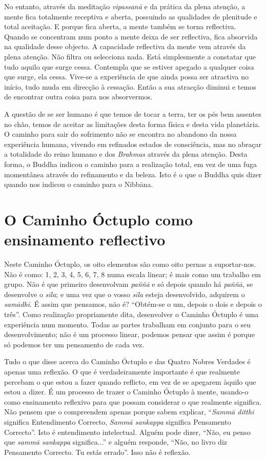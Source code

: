 No entanto, através da meditação \emph{vipassanā} e da prática da plena atenção,
a mente fica totalmente receptiva e aberta, possuindo as qualidades de plenitude
e total aceitação. E porque fica aberta, a mente também se torna reflectiva.
Quando se concentram num ponto a mente deixa de ser reflectiva, fica absorvida
na qualidade desse objecto. A capacidade reflectiva da mente vem através da
plena atenção. Não filtra ou selecciona nada. Está simplesmente a constatar que
tudo aquilo que surge cessa. Contempla que se estiver apegado a qualquer coisa
que surge, ela cessa. Vive-se a experiência de que ainda possa ser atractiva no
início, tudo muda em direcção à cessação. Então a sua atracção diminui e temos
de encontrar outra coisa para nos absorvermos.

A questão de se ser humano é que temos de tocar a terra, ter os pés bem assentes
no chão, temos de aceitar as limitações desta forma física e desta vida
planetária. O caminho para sair do sofrimento não se encontra no abandono da
nossa experiência humana, vivendo em refinados estados de consciência, mas no
abraçar a totalidade do reino humano e dos \emph{Brahmas} através da plena
atenção. Desta forma, o Buddha indicou o caminho para a realização total, em vez
de uma fuga momentânea através do refinamento e da beleza. Isto é o que o Buddha
quis dizer quando nos indicou o caminho para o Nibbāna.

\section{O Caminho Óctuplo como ensinamento reflectivo}

Neste Caminho Óctuplo, os oito elementos são como oito pernas a suportar-nos.
Não é como: 1, 2, 3, 4, 5, 6, 7, 8 numa escala linear; é mais como um trabalho
em grupo. Não é que primeiro desenvolvam \emph{paññā} e só depois quando há
\emph{paññā}, se desenvolve o \emph{sīla}; e uma vez que o vosso \emph{sīla}
esteja desenvolvido, adquirem o \emph{samādhi}. É assim que pensamos, não é?
“Obtém-se o um, depois o dois e depois o três”. Como realização propriamente
dita, desenvolver o Caminho Óctuplo é uma experiência num momento. Todas as
partes trabalham em conjunto para o seu desenvolvimento; não é um processo
linear, podemos pensar que assim é porque só podemos ter um pensamento de cada
vez.

Tudo o que disse acerca do Caminho Óctuplo e das Quatro Nobres Verdades é apenas
uma reflexão. O que é verdadeiramente importante é que realmente percebam o que
estou a fazer quando reflicto, em vez de se apegarem àquilo que estou a dizer. É
um processo de trazer o Caminho Óctuplo à mente, usando-o como ensinamento
reflexivo para que possam considerar o que realmente significa. Não pensem que o
compreendem apenas porque sabem explicar, “\emph{Sammā ditthi} significa
Entendimento Correcto, \emph{Sammā sankappa} significa Pensamento Correcto”.
Isto é entendimento intelectual. Alguém pode dizer, “Não, eu penso que
\emph{sammā sankappa} significa...” e alguém responde, “Não, no livro diz
Pensamento Correcto. Tu estás errado”. Isso não é reflexão.

